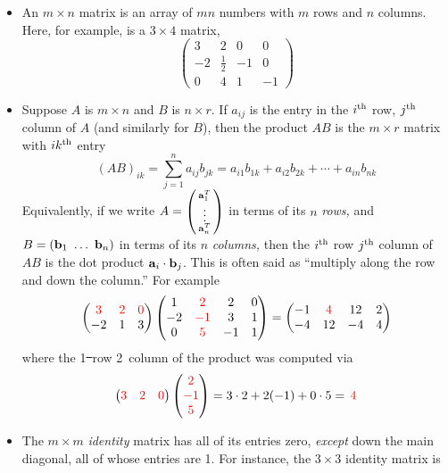 \begin{itemize}
  \item An $m\times n$ matrix is an array of $mn$ numbers with $m$ rows and $n$ columns. Here, for example, is a $3\times 4$ matrix,
  \[\begin{pmatrix}
  3&2&0&0\\
  -2&\frac 12&-1&0\\
  0&4&1&-1
  \end{pmatrix}\]
  \item Suppose $A$ is $m\times n$ and $B$ is $n\times r$. If $a_{ij}$ is the entry in the $i\textsuperscript{th}$ row, $j\textsuperscript{th}$ column of $A$ (and similarly for $B$), then the product $AB$ is the $m\times r$ matrix with $ik\textsuperscript{th}$ entry
  \[(AB)_{ik}=\sum_{j=1}^na_{ij}b_{jk} =a_{i1}b_{1k}+a_{i2}b_{2k}+\cdots +a_{in}b_{nk}\]
  Equivalently, if we write $A=\left(\begin{smallmatrix}{\mathbf{a}}_1^T\\\vdots\\{\mathbf{a}}_n^T\end{smallmatrix}\right)$ in terms of its $n$ \emph{rows,} and $B=(\vb_1\ \ldots\ \vb_n)$ in terms of its $n$ \emph{columns,} then the $i\textsuperscript{th}$ row $j\textsuperscript{th}$ column of $AB$ is the dot product ${\mathbf{a}}_i\cdot {\mathbf{b}}_j$. This is often said as ``multiply along the row and down the column.'' For example
  \[\begin{pmatrix}
  \textcolor{red}{3}&\textcolor{red}{2}&\textcolor{red}{0}\\
  -2&1&3
  \end{pmatrix}\begin{pmatrix}
  1&\textcolor{red}{2}&2&0\\
  -2&\textcolor{red}{-1}&3&1\\
  0&\textcolor{red}{5}&-1&1
  \end{pmatrix}
  =\begin{pmatrix}
  -1&\textcolor{red}{4}&12&2\\
  -4&12&-4&4
  \end{pmatrix}\]
  where the 1\st\ row 2\nd\ column of the product was computed via
  \[\begin{pmatrix}
  \textcolor{red}{3}&\textcolor{red}{2}&\textcolor{red}{0}
  \end{pmatrix}\begin{pmatrix}
  \textcolor{red}{2}\\
  \textcolor{red}{-1}\\
  \textcolor{red}{5}
  \end{pmatrix} =3\cdot 2+2(-1)+0\cdot 5 =\,\textcolor{red}{4}\]
  \item The $m\times m$ \emph{identity} matrix has all of its entries zero, \emph{except} down the main diagonal, all of whose entries are 1. For instance, the $3\times 3$ identity matrix is

\end{itemize}
